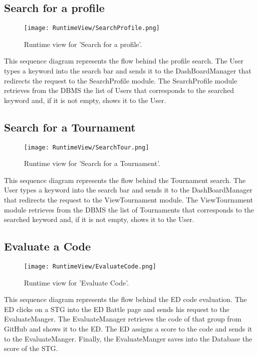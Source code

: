 \subsection{Search for a profile}
\begin{figure}[H]
    \begin{center}
        \texttt{[image: RuntimeView/SearchProfile.png]}
        \caption{Runtime view for 'Search for a profile'.}
        \label{fig:runtime_searchprofile}%
    \end{center}
\end{figure}
This sequence diagram represents the flow behind the profile search.
The User types a keyword into the search bar and sends it to the DashBoardManager that redirects the request to the SearchProfile module.
The SearchProfile module retrieves from the DBMS the list of Users that corresponds to the searched keyword and, if it is not empty, shows it to the User.


\subsection{Search for a Tournament}
\begin{figure}[H]
    \begin{center}
        \texttt{[image: RuntimeView/SearchTour.png]}
        \caption{Runtime view for 'Search for a Tournament'.}
        \label{fig:runtime_searchtournament}%
    \end{center}
\end{figure}
This sequence diagram represents the flow behind the Tournament search.
The User types a keyword into the search bar and sends it to the DashBoardManager that redirects the request to the ViewTournament module.
The ViewTournament module retrieves from the DBMS the list of Tournaments that corresponds to the searched keyword and, if it is not empty, shows it to the User.

\subsection{Evaluate a Code}
\begin{figure}[H]
    \begin{center}
        \texttt{[image: RuntimeView/EvaluateCode.png]}
        \caption{Runtime view for 'Evaluate Code'.}
        \label{fig:runtime_evaluatecode}%
    \end{center}
\end{figure}
This sequence diagram represents the flow behind the ED code evaluation.
The ED clicks on a STG into the ED Battle page and sends his request to the EvaluateManger. The EvaluateManager retrieves the code of that group from GitHub and shows it to the ED. The ED assigns a score to the code and sends it to the EvaluateManger. Finally, the EvaluateManger saves into the Database the score of the STG.


